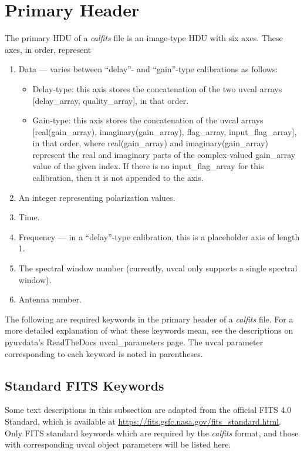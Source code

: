 \documentclass[11pt, oneside, english]{article}   	%
\begin{document}
\section{Primary Header}
The primary HDU of a \emph{calfits} file is an image-type HDU with six axes.
These axes, in order, represent 
\begin{enumerate}
	\item{Data --- varies between ``delay''- and ``gain''-type calibrations as follows:}
	\begin{itemize}
	\item Delay-type: this axis stores the concatenation of the two uvcal arrays [delay\_array, quality\_array], in that order.
	\item Gain-type: this axis stores the concatenation of the uvcal arrays [real(gain\_array), imaginary(gain\_array), flag\_array, input\_flag\_array], in that order, where real(gain\_array) and imaginary(gain\_array) represent the real and imaginary parts of the complex-valued gain\_array value of the given index. If there is no input\_flag\_array for this calibration, then it is not appended to the axis.
	\end{itemize}
	\item{An integer representing polarization values.}
	\item{Time.}
	\item{Frequency --- in a ``delay''-type calibration, this is a placeholder axis of length 1.}
	\item{The spectral window number (currently, uvcal only supports a single spectral window).}
	\item{Antenna number.}
\end{enumerate}

The following are required keywords in the primary header of a \emph{calfits} file.
For a more detailed explanation of what these keywords mean, see the descriptions on pyuvdata's ReadTheDocs uvcal\_parameters page. The uvcal parameter corresponding to each keyword is noted in parentheses. 
\subsection{Standard FITS Keywords}
Some text descriptions in this subsection are adapted from the official FITS 4.0 Standard, which is available at \url{https://fits.gsfc.nasa.gov/fits_standard.html}.
Only FITS standard keywords which are required by the \emph{calfits} format, and those with corresponding uvcal object parameters will be listed here.
\end{document}

